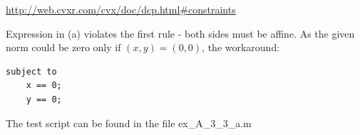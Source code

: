 \documentclass{article}
\begin{document}
\url{http://web.cvxr.com/cvx/doc/dcp.html#constraints}

Expression in (a) violates the first rule - both sides must be affine. As the given norm could be zero only if $(x, y) = (0, 0)$, the workaround:

\begin{verbatim}
subject to
	x == 0;
	y == 0;
\end{verbatim}

The test script can be found in the file 
ex\_A\_3\_3\_a.m \\
\end{document}
